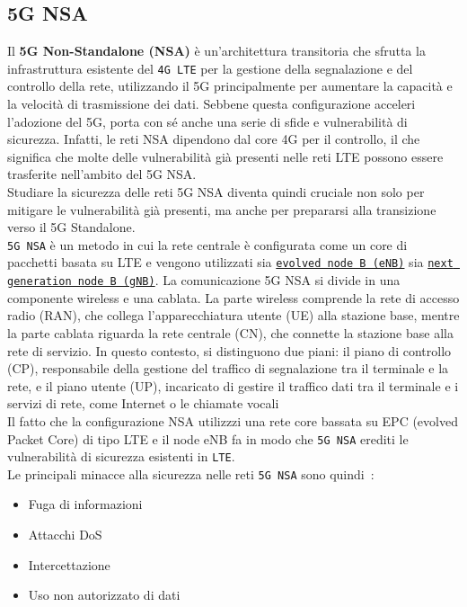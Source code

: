 \documentclass[english]{article}
\begin{document}
\subsection{5G NSA}
Il \textbf{5G Non-Standalone (NSA)} è un'architettura transitoria che sfrutta
la infrastruttura esistente del \texttt{4G LTE} per la gestione della
segnalazione e del controllo della rete, utilizzando il 5G principalmente per
aumentare la capacità e la velocità di trasmissione dei dati. Sebbene questa
configurazione acceleri l'adozione del 5G, porta con sé anche una serie di
sfide e vulnerabilità di sicurezza. Infatti, le reti NSA dipendono dal core 4G
per il controllo, il che significa che molte delle vulnerabilità già presenti
nelle reti LTE possono essere trasferite nell'ambito del 5G NSA.\@ \\ Studiare
la sicurezza delle reti 5G NSA diventa quindi cruciale non solo per mitigare le
vulnerabilità già presenti, ma anche per prepararsi alla transizione verso il
5G Standalone.\@ \\ \texttt{5G NSA} è un metodo in cui la rete centrale è
configurata come un core di pacchetti basata su LTE e vengono utilizzati sia
\texttt{\hyperlink{eNB}{evolved node B (eNB)}} sia \texttt{\hyperlink{gNB}{next
		generation node B (gNB)}}. La comunicazione 5G NSA si divide in una componente
wireless e una cablata. La parte wireless comprende la rete di accesso radio
(RAN), che collega l'apparecchiatura utente (UE) alla stazione base, mentre la
parte cablata riguarda la rete centrale (CN), che connette la stazione base
alla rete di servizio. In questo contesto, si distinguono due piani: il piano
di controllo (CP), responsabile della gestione del traffico di segnalazione tra
il terminale e la rete, e il piano utente (UP), incaricato di gestire il
traffico dati tra il terminale e i servizi di rete, come Internet o le chiamate
vocali \\ Il fatto che la configurazione NSA utilizzzi una rete core bassata su
EPC (evolved Packet Core) di tipo LTE e il node eNB fa in modo che \texttt{5G
	NSA} erediti le vulnerabilità di sicurezza esistenti in \texttt{LTE}.\@ \\ Le
principali minacce alla sicurezza nelle reti \texttt{5G NSA} sono
quindi~\cite{Park20215G}:
\begin{itemize}
	\item Fuga di informazioni
	\item Attacchi DoS
	\item Intercettazione
	\item Uso non autorizzato di dati
\end{itemize}
\end{document}
